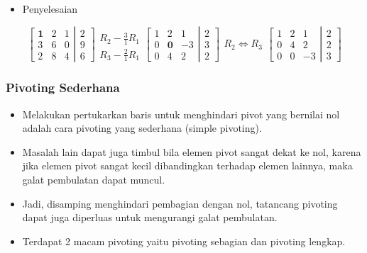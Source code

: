 \documentclass[pdflatex,compress,mathserif]{beamer}
\begin{document}
\begin{frame}
	\begin{itemize}
		\item Penyelesaian
	\end{itemize}
	
	\[
	\left[
		\begin{matrix}
			\textbf{1} & 2 & 1 \\
			3 & 6 & 0 \\
			2 & 8 & 4
		\end{matrix}
	\right|
	\left.
		\begin{matrix}
			2 \\
			9 \\
			6
		\end{matrix}
	\right]
	\begin{matrix}
		\\
		R_2 - \frac{3}{1}R_1 \\
		R_3 - \frac{2}{1}R_1
	\end{matrix}
	\left[
		\begin{matrix}
			1 & 2 & 1 \\
			0 & \textbf{0} & -3 \\
			0 & 4 & 2
		\end{matrix}
	\right|
	\left.
		\begin{matrix}
			2 \\
			3 \\
			2
		\end{matrix}
	\right]
	\begin{matrix}
	\\
	R_2 \Leftrightarrow R_3\\
	\end{matrix}
	\left[
	\begin{matrix}
	1 & 2 & 1 \\
	0 & 4 & 2 \\
	0 & 0 & -3
	\end{matrix}
	\right|
	\left.
	\begin{matrix}
	2 \\
	2 \\
	3
	\end{matrix}
	\right]
	\]
\end{frame}

\begin{frame}
	\frametitle{Pivoting Sederhana}
	\begin{itemize}
		\item Melakukan pertukarkan baris untuk menghindari pivot yang bernilai nol adalah cara pivoting yang sederhana (simple pivoting).
		\item Masalah lain dapat juga timbul bila elemen pivot sangat dekat ke nol, karena jika elemen pivot sangat kecil dibandingkan terhadap elemen lainnya, maka galat pembulatan dapat muncul.
		\item Jadi, disamping menghindari pembagian dengan nol, tatancang pivoting dapat juga diperluas untuk mengurangi galat pembulatan.
		\item Terdapat 2 macam pivoting yaitu pivoting sebagian dan pivoting lengkap.
	\end{itemize}
\end{frame}
\end{document}
